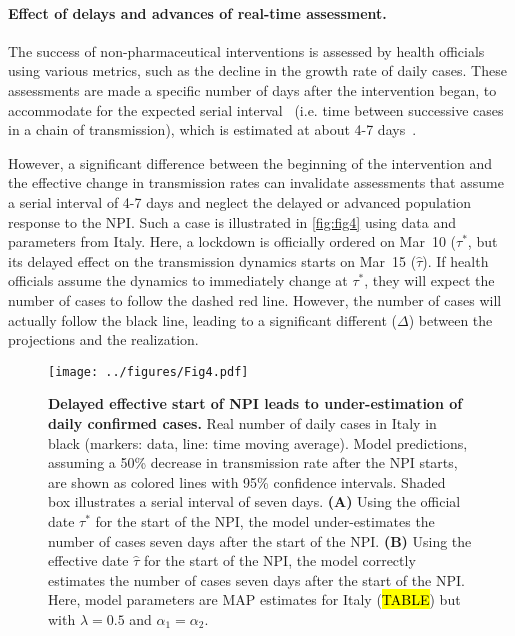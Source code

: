 \documentclass[12pt]{extarticle}
\begin{document}
\paragraph*{Effect of delays and advances of real-time assessment.}

The success of non-pharmaceutical interventions is assessed by health officials using various metrics, such as the decline in the growth rate of daily cases. These assessments are made a specific number of days after the intervention began, to accommodate for the expected serial interval~\citep{Banholzer2020} (i.e. time between successive cases in a chain of transmission), which is estimated at about 4-7 days~\citep{Gatto2020}. %

However, a significant difference between the beginning of the intervention and the effective change in transmission rates can invalidate assessments that assume a serial interval of 4-7 days and neglect the delayed or advanced population response to the NPI.
Such a case is illustrated in \autoref{fig:fig4} using data and parameters from Italy.
Here, a lockdown is officially ordered on Mar~10 ($\tau^*$, but its delayed effect on the transmission dynamics starts on Mar~15 ($\hat{\tau}$). If health officials assume the dynamics to immediately change at $\tau^*$, they will expect the number of cases to follow the dashed red line. However, the number of cases will actually follow the black line, leading to a significant different ($\Delta$) between the projections and the realization.


\begin{figure}[h]
    \centering
	\texttt{[image: ../figures/Fig4.pdf]}
    \caption{
    \textbf{Delayed effective start of NPI leads to under-estimation of daily confirmed cases.}
    Real number of daily cases in Italy in black (markers: data, line: time moving average). Model predictions, assuming a 50\% decrease in transmission rate after the NPI starts, are shown as colored lines with 95\% confidence intervals. 
    Shaded box illustrates a serial interval of seven days.
    \textbf{(A)} Using the official date $\tau^*$ for the start of the NPI,  the model under-estimates the number of cases seven days after the start of the NPI.
    \textbf{(B)} Using the effective date $\hat{\tau}$ for the start of the NPI,  the model correctly estimates the number of cases seven days after the start of the NPI.
    Here, model parameters are MAP estimates for Italy (\hl{TABLE}) but with $\lambda=0.5$ and $\alpha_1=\alpha_2$.
    } 
    \label{fig:fig4}
\end{figure}
\end{document}
